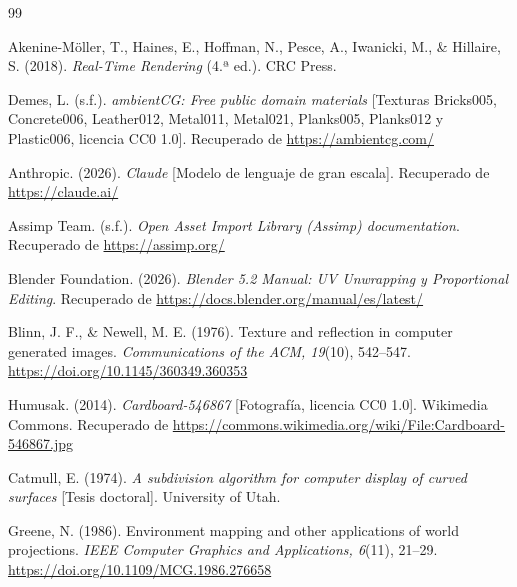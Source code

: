 
\renewcommand{\refname}{Referencias Bibliográficas}
\begin{thebibliography}{99}

Akenine-Möller, T., Haines, E., Hoffman, N., Pesce, A., Iwanicki, M., \& Hillaire, S. (2018). \textit{Real-Time Rendering} (4.ª ed.). CRC Press.

Demes, L. (s.f.). \textit{ambientCG: Free public domain materials} [Texturas Bricks005, Concrete006, Leather012, Metal011, Metal021, Planks005, Planks012 y Plastic006, licencia CC0 1.0]. Recuperado de \url{https://ambientcg.com/}

Anthropic. (2026). \textit{Claude} [Modelo de lenguaje de gran escala]. Recuperado de \url{https://claude.ai/}

Assimp Team. (s.f.). \textit{Open Asset Import Library (Assimp) documentation}. Recuperado de \url{https://assimp.org/}

Blender Foundation. (2026). \textit{Blender 5.2 Manual: UV Unwrapping y Proportional Editing}. Recuperado de \url{https://docs.blender.org/manual/es/latest/}

Blinn, J. F., \& Newell, M. E. (1976). Texture and reflection in computer generated images. \textit{Communications of the ACM, 19}(10), 542--547. \url{https://doi.org/10.1145/360349.360353}

Humusak. (2014). \textit{Cardboard-546867} [Fotografía, licencia CC0 1.0]. Wikimedia Commons. Recuperado de \url{https://commons.wikimedia.org/wiki/File:Cardboard-546867.jpg}

Catmull, E. (1974). \textit{A subdivision algorithm for computer display of curved surfaces} [Tesis doctoral]. University of Utah.

Greene, N. (1986). Environment mapping and other applications of world projections. \textit{IEEE Computer Graphics and Applications, 6}(11), 21--29. \url{https://doi.org/10.1109/MCG.1986.276658}


\end{thebibliography}
